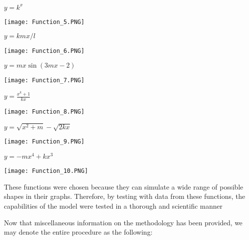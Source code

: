 \documentclass{article}
\begin{document}
\Large
\begin{center}
    $y=k^x$
\end{center}
\vspace{-0.6cm}
\begin{center}
    \texttt{[image: Function\_5.PNG]}
\end{center}

\begin{center}
    $y=kmx/l$
\end{center}
\vspace{-0.6cm}
\begin{center}
    \texttt{[image: Function\_6.PNG]}
\end{center}
\newpage

\Large
\begin{center}
    $y=mx\sin{(3mx-2)}$
\end{center}
\vspace{-0.5cm}
\begin{center}
    \texttt{[image: Function\_7.PNG]}
\end{center}

\begin{center}
    $y=\frac{x^k+1}{kx}$
\end{center}
\begin{center}
    \texttt{[image: Function\_8.PNG]}
\end{center}

\newpage

\Large
\begin{center}
    $y=\sqrt{x^2+m}-\sqrt{2kx}$
\end{center}
\vspace{-0.5cm}
\begin{center}
    \texttt{[image: Function\_9.PNG]}
\end{center}
\Large
\begin{center}
    $y=-mx^4+kx^3$
\end{center}
\vspace{-0.6cm}
\begin{center}
    \texttt{[image: Function\_10.PNG]}
\end{center}
\normalsize

These functions were chosen because they can simulate a wide range of possible shapes in their graphs. Therefore, by testing with data from these functions, the capabilities of the model were tested in a thorough and scientific manner

Now that miscellaneous information on the methodology has been provided, we may denote the entire procedure as the following:
\end{document}

